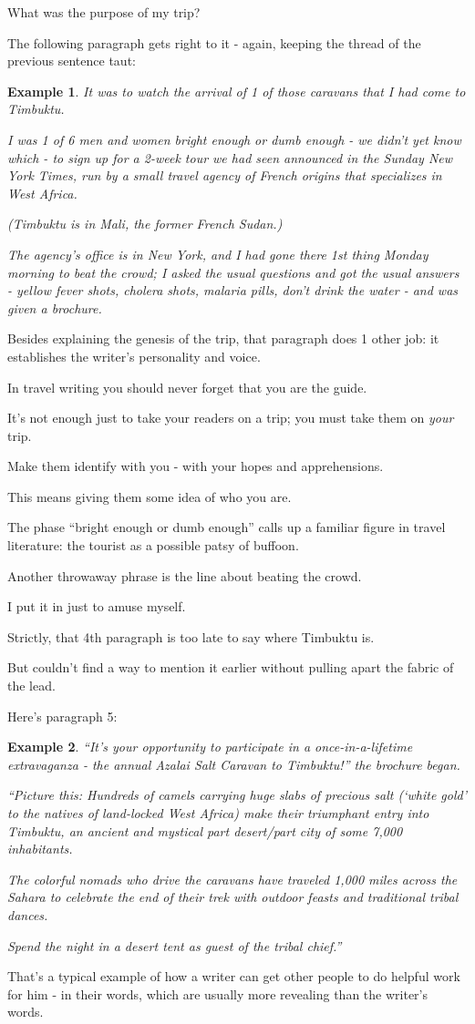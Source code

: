 \documentclass{book}
\numberwithin{equation}{section}
\newtheorem{example}{Example}[chapter]
\begin{document}
What was the purpose of my trip?

The following paragraph gets right to it - again, keeping the thread of the previous sentence taut:
\begin{example}
    It was to watch the arrival of 1 of those caravans that I had come to Timbuktu.
    
    I was 1 of 6 men and women bright enough or dumb enough - we didn't yet know which - to sign up for a 2-week tour we had seen announced in the Sunday \emph{New York Times}, run by a small travel agency of French origins that specializes in West Africa.
    
    (Timbuktu is in Mali, the former French Sudan.)
    
    The agency's office is in New York, and I had gone there 1st thing Monday morning to beat the crowd; I asked the usual questions and got the usual answers - yellow fever shots, cholera shots, malaria pills, don't drink the water - and was given a brochure.
\end{example}
Besides explaining the genesis of the trip, that paragraph does 1 other job: it establishes the writer's personality and voice.

In travel writing you should never forget that you are the guide.

It's not enough just to take your readers on a trip; you must take them on \textit{your} trip.

Make them identify with you - with your hopes and apprehensions.

This means giving them some idea of who you are.

The phase ``bright enough or dumb enough'' calls up a familiar figure in travel literature: the tourist as a possible patsy of buffoon.

Another throwaway phrase is the line about beating the crowd.

I put it in just to amuse myself.

Strictly, that 4th paragraph is too late to say where Timbuktu is.

But couldn't find a way to mention it earlier without pulling apart the fabric of the lead.

%
Here's paragraph 5:
\begin{example}
    ``It's your opportunity to participate in a once-in-a-lifetime extravaganza - the annual Azalai Salt Caravan to Timbuktu!'' the brochure began.
    
    ``Picture this: Hundreds of camels carrying huge slabs of precious salt (`white gold' to the natives of land-locked West Africa) make their triumphant entry into Timbuktu, an ancient and mystical part desert/part city of some 7,000 inhabitants.
    
    The colorful nomads who drive the caravans have traveled 1,000 miles across the Sahara to celebrate the end of their trek with outdoor feasts and traditional tribal dances.
    
    Spend the night in a desert tent as guest of the tribal chief.''
\end{example}
That's a typical example of how a writer can get other people to do helpful work for him - in their words, which are usually more revealing than the writer's words.
\end{document}
